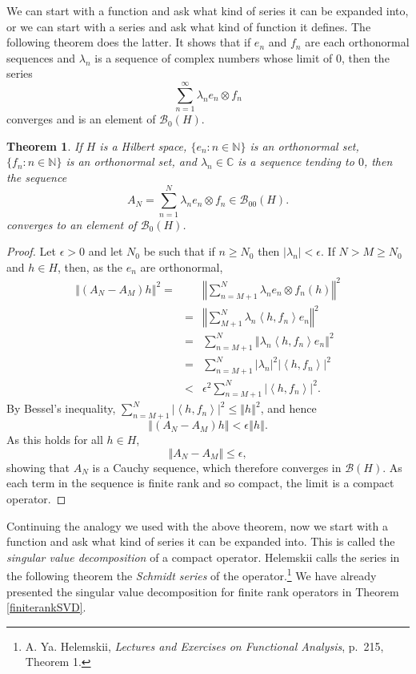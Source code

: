 \documentclass{article}
\newcommand{\inner}[2]{\left\langle #1, #2 \right\rangle}
\newcommand{\norm}[1]{\left\Vert #1 \right\Vert}
\newtheorem{theorem}{Theorem}
\theoremstyle{definition}
\begin{document}
We can start with a function and ask what kind of series it can be expanded into, or we can start with a series and ask what kind of function it defines. The following theorem does the latter.
It shows that if $e_n$ and $f_n$ are each orthonormal sequences and $\lambda_n$ is a sequence of complex numbers whose
limit of $0$, then the series
\[
\sum_{n=1}^\infty \lambda_n e_n \otimes f_n
\]
converges and  is an element of $\mathscr{B}_0(H)$.

\begin{theorem}
If $H$ is a Hilbert space,
 $\{e_n:n \in \mathbb{N}\}$ is an orthonormal set, $\{f_n: n\in \mathbb{N}\}$ is an orthonormal set, 
and $\lambda_n \in \mathbb{C}$ is a sequence tending to $0$, then the sequence
\[
A_N = \sum_{n=1}^N \lambda_n e_n \otimes f_n \in \mathscr{B}_{00}(H).
\]
converges to an element of $\mathscr{B}_0(H)$.
\label{compactdefine}
\end{theorem}
\begin{proof}
Let $\epsilon>0$ and let $N_0$ be such that if $n \geq N_0$ then $|\lambda_n|<\epsilon$. If $N > M \geq N_0$ and $h \in H$, then, as the $e_n$ are orthonormal,
\begin{eqnarray*}
\norm{(A_N-A_M)h}^2=&&\norm{\sum_{n=M+1}^N \lambda_n e_n \otimes f_n (h)}^2\\
&=&\norm{\sum_{M+1}^N \lambda_n \inner{h}{f_n}e_n}^2\\
&=&\sum_{n=M+1}^N \norm{\lambda_n \inner{h}{f_n}e_n}^2\\
&=&\sum_{n=M+1}^N |\lambda_n|^2 |\inner{h}{f_n}|^2\\
&<&\epsilon^2 \sum_{n=M+1}^N  |\inner{h}{f_n}|^2.
\end{eqnarray*}
By Bessel's inequality, $\sum_{n=M+1}^N  |\inner{h}{f_n}|^2 \leq \norm{h}^2$, and hence
\[
\norm{(A_N-A_M)h} < \epsilon \norm{h}.
\]
As this holds for all $h \in H$, 
\[
\norm{A_N-A_M} \leq \epsilon,
\]
showing that $A_N$ is a Cauchy sequence, which  therefore converges in $\mathscr{B}(H)$.  As each term in the sequence is finite rank and so compact, the limit is a
compact operator.
\end{proof}

Continuing the analogy we used with the above theorem, 
now we start with a function and ask what kind of series it can be expanded into. This is called the {\em singular value decomposition} of a compact operator.
Helemskii calls the series in the following theorem the {\em Schmidt series} of 
the operator.\footnote{A. Ya. Helemskii, {\em Lectures and Exercises on Functional Analysis}, p.~215, Theorem 1.} We have already presented the singular value decomposition
for finite rank operators in Theorem \ref{finiterankSVD}.
\end{document}
